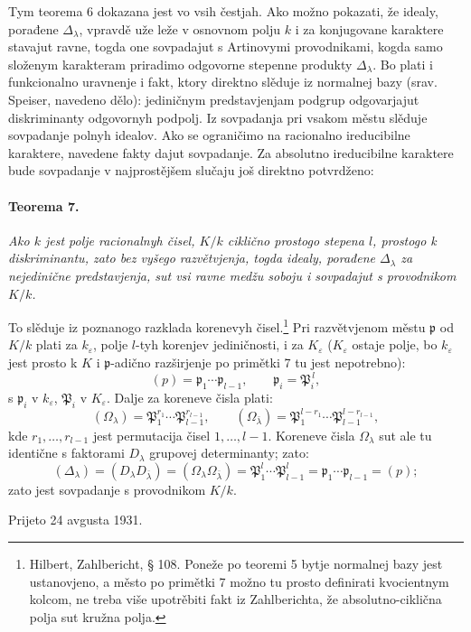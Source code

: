 \documentclass[11pt]{article}
\providecommand{\frakp}{\mathfrak{p}}
\begin{document}
Tym teorema 6 dokazana jest vo vsih čestjah. Ako možno pokazati, že idealy, porađene \(\Delta_\lambda\), vpravdě uže leže v osnovnom polju \(k\) i za konjugovane karaktere stavajut ravne, togda one sovpadajut s Artinovymi provodnikami, kogda samo složenym karakteram priradimo odgovorne stepenne produkty \(\Delta_\lambda\). Bo plati i funkcionalno uravnenje i fakt, ktory direktno slěduje iz normalnej bazy (srav. Speiser, navedeno dělo): jediničnym predstavjenjam podgrup odgovarjajut diskriminanty odgovornyh podpolj. Iz sovpadanja pri vsakom městu slěduje sovpadanje polnyh idealov. Ako se ograničimo na racionalno ireducibilne karaktere, navedene fakty dajut sovpadanje. Za absolutno ireducibilne karaktere bude sovpadanje v najprostějšem slučaju još direktno potvrdženo:

\paragraph{Teorema 7.}
\emph{Ako \(k\) jest polje racionalnyh čisel, \(K/k\) ciklično prostogo stepena \(l\), prostogo k diskriminantu, zato bez vyšego razvětvjenja, togda idealy, porađene \(\Delta_\lambda\) za nejedinične predstavjenja, sut vsi ravne medžu soboju i sovpadajut s provodnikom \(K/k\).}

To slěduje iz poznanogo razklada korenevyh čisel.\footnote{Hilbert, Zahlbericht, § 108. Poneže po teoremi 5 bytje normalnej bazy jest ustanovjeno, a město po primětki 7 možno tu prosto definirati kvocientnym kolcom, ne treba više upotrěbiti fakt iz Zahlberichta, že absolutno-ciklična polja sut kružna polja.} Pri razvětvjenom městu \(\frakp\) od \(K/k\) plati za \(k_\varepsilon\), polje \(l\)-tyh korenjev jediničnosti, i za \(K_\varepsilon\) (\(K_\varepsilon\) ostaje polje, bo \(k_\varepsilon\) jest prosto k \(K\) i \(\frakp\)-adično razširjenje po primětki 7 tu jest nepotrebno):
\[
        (p)=\frakp_1\cdots\frakp_{l-1},
        \qquad
        \frakp_i=\mathfrak P_i^{\,l},
\]
s \(\frakp_i\) v \(k_\varepsilon\), \(\mathfrak P_i\) v \(K_\varepsilon\). Dalje za koreneve čisla plati:
\[
        (\Omega_\lambda)=\mathfrak P_1^{r_1}\cdots\mathfrak P_{l-1}^{r_{l-1}},
        \qquad
        (\Omega_{\bar\lambda})=
        \mathfrak P_1^{l-r_1}\cdots \mathfrak P_{l-1}^{l-r_{l-1}},
\]
kde \(r_1,\ldots,r_{l-1}\) jest permutacija čisel \(1,\ldots,l-1\). Koreneve čisla \(\Omega_\lambda\) sut ale tu identične s faktorami \(D_\lambda\) grupovej determinanty; zato:
\[
        (\Delta_\lambda)=(D_\lambda D_{\bar\lambda})
        =(\Omega_\lambda\Omega_{\bar\lambda})
        =\mathfrak P_1^{l}\cdots\mathfrak P_{l-1}^{l}
        =\frakp_1\cdots\frakp_{l-1}=(p);
\]
zato jest sovpadanje s provodnikom \(K/k\).

\begin{center}
Prijeto 24 avgusta 1931.
\end{center}
\end{document}
